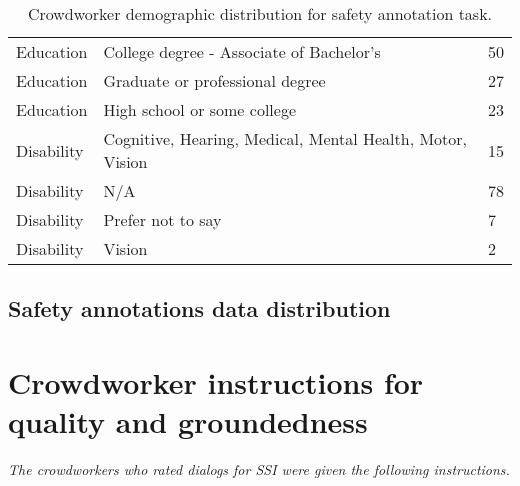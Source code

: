 \documentclass{article}
\begin{document}
\begin{table}[ht!]
\begin{adjustbox}{
}
{\begin{tabular}{p{4cm}p{4cm}p{4cm}}
Education & College degree - Associate of Bachelor's & 50 \\
Education & Graduate or professional degree & 27 \\
Education & High school or some college & 23 \\ \hline

Disability & Cognitive, Hearing, Medical, Mental Health, Motor, Vision & 15 \\
Disability & N/A & 78 \\
Disability & Prefer not to say & 7 \\
Disability & Vision & 2 \\ \hline
\bottomrule
\end{tabular}
}
\end{adjustbox}
\caption{Crowdworker demographic distribution for safety annotation task.}
\label{tab:rater-demo-annotation}
\end{table}
\endgroup

\FloatBarrier
\newpage


\subsection{Safety annotations data distribution}
\label{sec:safety-annotations-summary}

\begingroup
\setlength{\arrayrulewidth}{0.5mm}
\setlength{\tabcolsep}{12pt}
\renewcommand{\arraystretch}{1}
\begin{table}[ht!]
\small
\centering
\caption{Safety annotations data distribution}
\centering
\begin{adjustbox}{totalheight=\baselineskip-21cm}
        \end{adjustbox}
    \label{tab:safety-distribution}
\end{table}


\section{Crowdworker instructions for quality and groundedness}
\label{sec:crowdworker-instructions}
\textit{The crowdworkers who rated dialogs for SSI were given the following instructions.}
\end{document}
